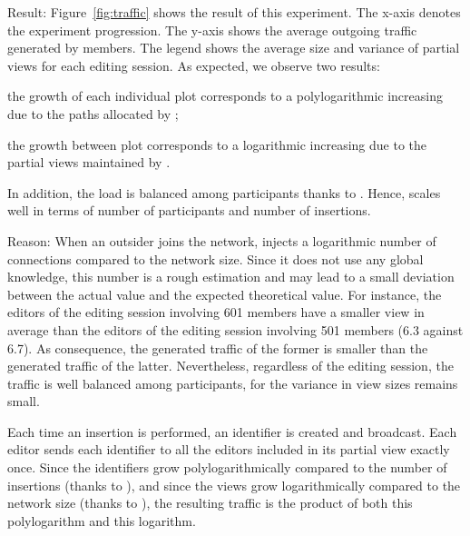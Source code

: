 \begin{asparadesc}
\item [Result:] Figure~\ref{fig:traffic} shows the result of this experiment.
  The x-axis denotes the experiment progression. The y-axis shows the average
  outgoing traffic generated by members. The legend shows the average size and
  variance of partial views for each editing session.  As expected, we observe
  two results:
  \begin{inparaenum}[(i)]
  \item the growth of each individual plot corresponds to a polylogarithmic
    increasing due to the paths allocated by \LSEQ;
  \item the growth between plot corresponds to a logarithmic increasing due to
    the partial views maintained by \SPRAY.
  \end{inparaenum}
  In addition, the load is balanced among participants thanks to \SPRAY.  Hence,
  \CRATE scales well in terms of number of participants and number of
  insertions.
\item [Reason:] When an outsider joins the network, \SPRAY injects a logarithmic
  number of connections compared to the network size. Since it does not use any
  global knowledge, this number is a rough estimation and may lead to a small
  deviation between the actual value and the expected theoretical value. For
  instance, the editors of the editing session involving 601 members have a
  smaller view in average than the editors of the editing session involving 501
  members (6.3 against 6.7). As consequence, the generated traffic of the former
  is smaller than the generated traffic of the latter. Nevertheless, regardless
  of the editing session, the traffic is well balanced among participants, for
  the variance in view sizes remains small.

  Each time an insertion is performed, an identifier is created and broadcast.
  Each editor sends each identifier to all the editors included in its partial
  view exactly once. Since the identifiers grow polylogarithmically compared to
  the number of insertions (thanks to \LSEQ), and since the views grow
  logarithmically compared to the network size (thanks to \SPRAY), the resulting
  traffic is the product of both this polylogarithm and this logarithm.
\end{asparadesc}

